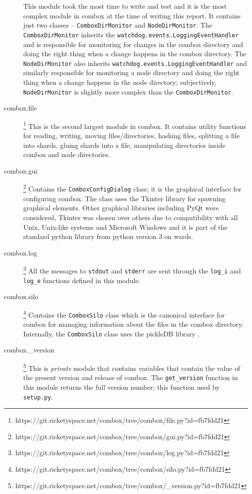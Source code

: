 \begin{description}
  This module took the most time to write and test and it is the most
  complex module in combox at the time of writing this report. It
  contains just two classes -- \verb+ComboxDirMonitor+ and
  \verb+NodeDirMonitor+. The \verb+ComboxDirMonitor+ inherits the
  \verb+watchdog.events.LoggingEventHandler+ and is responsible for
  monitoring for changes in the combox directory and doing the right
  thing when a change happens in the combox directory. The
  \verb+NodeDirMonitor+ also inherits
  \verb+watchdog.events.LoggingEventHandler+ and similarly responsible
  for monitoring a node directory and doing the right thing when a
  change happens in the node directory; subjectively,
  \verb+NodeDirMonitor+ is slightly more complex than the
  \verb+ComboxDirMonitor+.
\item[combox.file]
  \footnote{https://git.ricketyspace.net/combox/tree/combox/file.py?id=fb7fdd21}
  This is the second largest module in combox. It contains utility
  functions for reading, writing, moving files/directories, hashing
  files, splitting a file into shards, gluing shards into a file,
  manipulating directories inside combox and node directories.
\item[combox.gui]
  \footnote{https://git.ricketyspace.net/combox/tree/combox/gui.py?id=fb7fdd21}
  Contains the \verb+ComboxConfigDialog+ class; it is the graphical
  interface for configuring combox. The class uses the Tkinter library
  \cite{pylib:tkinter} for spawning graphical elements. Other
  graphical libraries including PyQt \cite{pylib:qt} were considered,
  Tkinter was chosen over others due to compatibility with all Unix,
  Unix-like systems and Microsoft Windows and it is part of the
  standard python library from python version 3 on wards.
\item[combox.log]
  \footnote{https://git.ricketyspace.net/combox/tree/combox/log.py?id=fb7fdd21}
  All the messages to \verb+stdout+ and \verb+stderr+ are sent through
  the \verb+log_i+ and \verb+log_e+ functions defined in this module.
\item[combox.silo]
  \footnote{https://git.ricketyspace.net/combox/tree/combox/silo.py?id=fb7fdd21}
  Contains the \verb+ComboxSilo+ class which is the canonical
  interface for combox for managing information about the files in the
  combox directory. Internally, the \verb+ComboxSilo+ class uses the
  pickleDB library \cite{pylib:pickledb}.
\item[combox.\_version]
  \footnote{https://git.ricketyspace.net/combox/tree/combox/\_version.py?id=fb7fdd21}
  This is \emph{private} module that contains variables that contain
  the value of the present version and release of combox. The
  \verb+get_version+ function in this module returns the full version
  number; this function used by \verb+setup.py+.
\end{description}

